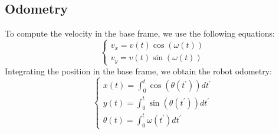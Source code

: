 \subsection{Odometry}
To compute the velocity in the base frame, we use the following equations:
\[\begin{cases}
    v_x = v(t) \cos (\omega(t)) \\
    v_y = v(t) \sin (\omega(t))
\end{cases}\]
Integrating the position in the base frame, we obtain the robot odometry:
\[\begin{cases}
    x(t)=\int_0^t \cos\left(\theta(t^\prime)\right) dt^\prime \\
    y(t)=\int_0^t \sin\left(\theta(t^\prime)\right) dt^\prime \\
    \theta(t) = \int_0^t\omega(t^\prime) dt^\prime
\end{cases}\]